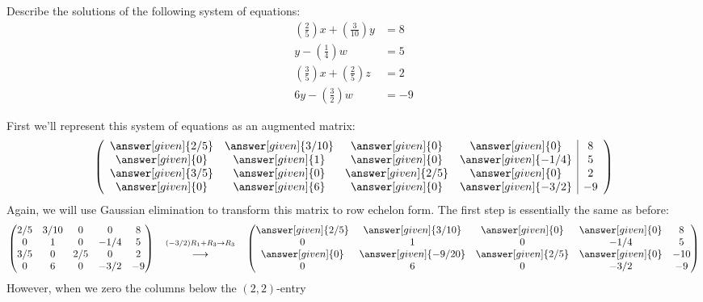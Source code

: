\documentclass{ximera}
\begin{document}
\begin{example}[No solutions]
  Describe the solutions of the following system of equations:
  \begin{align*}
\left(\frac{2}{5}\right)x + \left(\frac{3}{10}\right) y &= 8\\
y -\left(\frac{1}{4}\right)w &= 5\\
\left(\frac{3}{5}\right)x + \left(\frac{2}{5}\right)z &= 2\\
6y - \left(\frac{3}{2}\right)w &= -9
\end{align*}
\begin{explanation}
First we'll represent this system of equations as an augmented matrix:
\[
  \left(
    \begin{array}{cccc|c}
      \answer[given]{2/5}&  \answer[given]{3/10} & \answer[given]{0} &\answer[given]{0} &8 \\
      \answer[given]{0}&  \answer[given]{1} & \answer[given]{0} &\answer[given]{-1/4} & 5\\
      \answer[given]{3/5}&  \answer[given]{0} & \answer[given]{2/5} &\answer[given]{0} &2\\
      \answer[given]{0}&  \answer[given]{6} & \answer[given]{0} &\answer[given]{-3/2} &-9
    \end{array}
  \right)
\]
Again, we will use Gaussian elimination to transform this matrix to
row echelon form. The first step is essentially the same as before:
\[
  \begin{pmatrix}
    {2/5}&  {3/10} & {0} &{0} &8 \\
    {0}&  {1} & {0} &{-1/4} & 5\\
    {3/5}&  {0} & {2/5} &{0} &2\\
    {0}&  {6} & {0} &{-3/2} &-9
  \end{pmatrix}
  \quad
  \begin{matrix}
    \scriptstyle(-3/2) R_1 + R_3\to R_3\\
    \longrightarrow
  \end{matrix}
  \quad
  \begin{pmatrix}
    \answer[given]{2/5}&  \answer[given]{3/10} & \answer[given]{0} &\answer[given]{0} &8 \\
    {0}&  {1} & {0} &{-1/4} & 5\\
    \answer[given]{0}&  \answer[given]{-9/20} & \answer[given]{2/5} &\answer[given]{0} &-10\\
    {0}&  {6} & {0} &{-3/2} &-9
  \end{pmatrix}
\]
However, when we zero the columns below the $(2,2)$-entry

\end{explanation}
\end{example}
\end{document}
